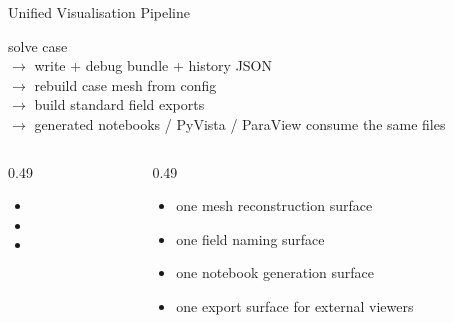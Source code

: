 \documentclass[aspectratio=169,10pt]{beamer}
\begin{document}
\begin{frame}{Unified Visualisation Pipeline}
\small
\begin{pseudobox}
solve case\\
$\rightarrow$ write  + debug bundle + history JSON\\
$\rightarrow$ rebuild case mesh from config\\
$\rightarrow$ build standard field exports\\
$\rightarrow$ generated notebooks / PyVista / ParaView consume the same files
\end{pseudobox}
\vspace{0.20cm}
\begin{columns}[T,totalwidth=\textwidth]
\begin{column}{0.49\textwidth}
\begin{softbox}
\begin{itemize}
  \item {}
  \item {}
  \item {}
\end{itemize}
\end{softbox}
\end{column}
\begin{column}{0.49\textwidth}
\begin{softbox}
\begin{itemize}
  \item one mesh reconstruction surface
  \item one field naming surface
  \item one notebook generation surface
  \item one export surface for external viewers
\end{itemize}
\end{softbox}
\end{column}
\end{columns}
\end{frame}
\end{document}
